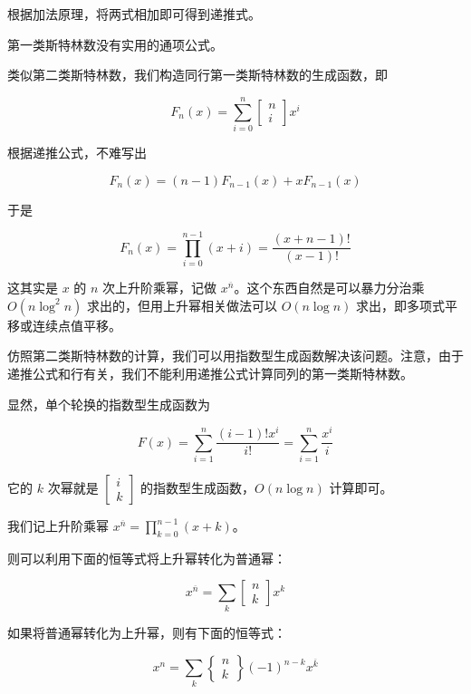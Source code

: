 根据加法原理，将两式相加即可得到递推式。


第一类斯特林数没有实用的通项公式。


类似第二类斯特林数，我们构造同行第一类斯特林数的生成函数，即

$$F_n(x)=\sum\limits_{i=0}^n\begin{bmatrix}n\\i\end{bmatrix}x^i$$

根据递推公式，不难写出

$$F_n(x)=(n-1)F_{n-1}(x)+xF_{n-1}(x)$$

于是

$$F_n(x)=\prod\limits_{i=0}^{n-1}(x+i)=\dfrac{(x+n-1)!}{(x-1)!}$$

这其实是 $x$ 的 $n$ 次上升阶乘幂，记做 $x^{\overline n}$。这个东西自然是可以暴力分治乘 $O(n\log^2n)$ 求出的，但用上升幂相关做法可以 $O(n\log n)$ 求出，即多项式平移或连续点值平移。


仿照第二类斯特林数的计算，我们可以用指数型生成函数解决该问题。注意，由于递推公式和行有关，我们不能利用递推公式计算同列的第一类斯特林数。

显然，单个轮换的指数型生成函数为

$$F(x)=\sum\limits_{i=1}^n\dfrac{(i-1)!x^i}{i!}=\sum\limits_{i=1}^n\dfrac{x^i}{i}$$

它的 $k$ 次幂就是 $\begin{bmatrix}i\\k\end{bmatrix}$ 的指数型生成函数，$O(n\log n)$ 计算即可。




我们记上升阶乘幂 $x^{\overline{n}}=\prod_{k=0}^{n-1} (x+k)$。

则可以利用下面的恒等式将上升幂转化为普通幂：

$$
x^{\overline{n}}=\sum_{k} \begin{bmatrix}n\\ k\end{bmatrix} x^k
$$

如果将普通幂转化为上升幂，则有下面的恒等式：

$$
x^n=\sum_{k} \begin{Bmatrix}n\\ k\end{Bmatrix} (-1)^{n-k} x^{\overline{k}}
$$

